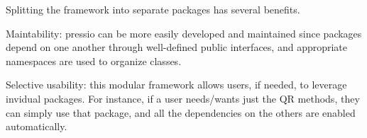 Splitting the framework into separate packages has several benefits.
\begin{DoxyItemize}
\item Maintability\+: {\ttfamily pressio} can be more easily developed and maintained since packages depend on one another through well-\/defined public interfaces, and appropriate namespaces are used to organize classes.
\item Selective usability\+: this modular framework allows users, if needed, to leverage invidual packages. For instance, if a user needs/wants just the QR methods, they can simply use that package, and all the dependencies on the others are enabled automatically. 
\end{DoxyItemize}